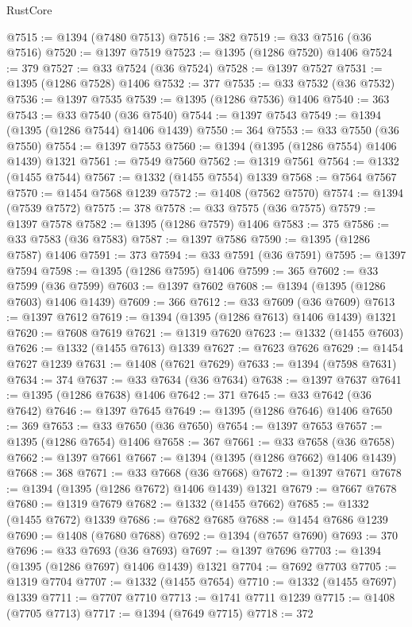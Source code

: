 \begin{lexlean}{RustCore}
\begin{coremodule}
@7515 := @1394 (@7480 @7513)
@7516 := 382
@7519 := @33 @7516 (@36 @7516)
@7520 := @1397 @7519
@7523 := @1395 (@1286 @7520) @1406
@7524 := 379
@7527 := @33 @7524 (@36 @7524)
@7528 := @1397 @7527
@7531 := @1395 (@1286 @7528) @1406
@7532 := 377
@7535 := @33 @7532 (@36 @7532)
@7536 := @1397 @7535
@7539 := @1395 (@1286 @7536) @1406
@7540 := 363
@7543 := @33 @7540 (@36 @7540)
@7544 := @1397 @7543
@7549 := @1394 (@1395 (@1286 @7544) @1406 @1439)
@7550 := 364
@7553 := @33 @7550 (@36 @7550)
@7554 := @1397 @7553
@7560 := @1394 (@1395 (@1286 @7554) @1406 @1439) @1321
@7561 := @7549 @7560
@7562 := @1319 @7561
@7564 := @1332 (@1455 @7544)
@7567 := @1332 (@1455 @7554) @1339
@7568 := @7564 @7567
@7570 := @1454 @7568 @1239
@7572 := @1408 (@7562 @7570)
@7574 := @1394 (@7539 @7572)
@7575 := 378
@7578 := @33 @7575 (@36 @7575)
@7579 := @1397 @7578
@7582 := @1395 (@1286 @7579) @1406
@7583 := 375
@7586 := @33 @7583 (@36 @7583)
@7587 := @1397 @7586
@7590 := @1395 (@1286 @7587) @1406
@7591 := 373
@7594 := @33 @7591 (@36 @7591)
@7595 := @1397 @7594
@7598 := @1395 (@1286 @7595) @1406
@7599 := 365
@7602 := @33 @7599 (@36 @7599)
@7603 := @1397 @7602
@7608 := @1394 (@1395 (@1286 @7603) @1406 @1439)
@7609 := 366
@7612 := @33 @7609 (@36 @7609)
@7613 := @1397 @7612
@7619 := @1394 (@1395 (@1286 @7613) @1406 @1439) @1321
@7620 := @7608 @7619
@7621 := @1319 @7620
@7623 := @1332 (@1455 @7603)
@7626 := @1332 (@1455 @7613) @1339
@7627 := @7623 @7626
@7629 := @1454 @7627 @1239
@7631 := @1408 (@7621 @7629)
@7633 := @1394 (@7598 @7631)
@7634 := 374
@7637 := @33 @7634 (@36 @7634)
@7638 := @1397 @7637
@7641 := @1395 (@1286 @7638) @1406
@7642 := 371
@7645 := @33 @7642 (@36 @7642)
@7646 := @1397 @7645
@7649 := @1395 (@1286 @7646) @1406
@7650 := 369
@7653 := @33 @7650 (@36 @7650)
@7654 := @1397 @7653
@7657 := @1395 (@1286 @7654) @1406
@7658 := 367
@7661 := @33 @7658 (@36 @7658)
@7662 := @1397 @7661
@7667 := @1394 (@1395 (@1286 @7662) @1406 @1439)
@7668 := 368
@7671 := @33 @7668 (@36 @7668)
@7672 := @1397 @7671
@7678 := @1394 (@1395 (@1286 @7672) @1406 @1439) @1321
@7679 := @7667 @7678
@7680 := @1319 @7679
@7682 := @1332 (@1455 @7662)
@7685 := @1332 (@1455 @7672) @1339
@7686 := @7682 @7685
@7688 := @1454 @7686 @1239
@7690 := @1408 (@7680 @7688)
@7692 := @1394 (@7657 @7690)
@7693 := 370
@7696 := @33 @7693 (@36 @7693)
@7697 := @1397 @7696
@7703 := @1394 (@1395 (@1286 @7697) @1406 @1439) @1321
@7704 := @7692 @7703
@7705 := @1319 @7704
@7707 := @1332 (@1455 @7654)
@7710 := @1332 (@1455 @7697) @1339
@7711 := @7707 @7710
@7713 := @1741 @7711 @1239
@7715 := @1408 (@7705 @7713)
@7717 := @1394 (@7649 @7715)
@7718 := 372

\end{coremodule}
\end{lexlean}
